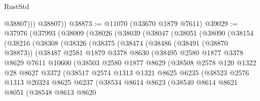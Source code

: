 \begin{lexlean}{RustStd}
\begin{coremodule}
              @38807)))
        @38807))
@38873 := @11070 (@33670 @1879 @7611)
@39029 := @37976
    (@37993
      (@38009
        (@38026
          (@38039
            (@38047
              (@38051
                (@38090
                  (@38154
                    (@38216
                      (@38308
                        (@38326
                          (@38375
                            (@38474
                              (@38486
                                (@38491 (@38870 @38873))
                                (@38487
                                  @2581
                                  @1879
                                  @3378
                                  @8630
                                  (@38495
                                    @2580
                                    @1877
                                    @3378
                                    @8629
                                    @7611
                                    @10600
                                    (@38503
                                      @2580
                                      @1877
                                      @8629
                                      (@38508
                                        @2578
                                        @120
                                        @1322
                                        @28
                                        @8627
                                        @3372
                                        (@38517
                                          @2574
                                          @1313
                                          @1321
                                          @8625
                                          @6235
                                          (@38523
                                            @2576
                                            @1313
                                            @20324
                                            @8625
                                            @6237
                                            (@38534
                                              @8614
                                              @8623
                                              (@38540
                                                @8614
                                                @8621
                                                @8051
                                                (@38548
                                                  @8613
                                                  @8620

\end{coremodule}
\end{lexlean}
